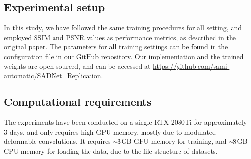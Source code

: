 \subsection{Experimental setup}

In this study, we have followed the same training procedures for all setting, and employed SSIM and PSNR values as performance metrics, as described in the original paper. The parameters for all training settings can be found in the configuration file in our GitHub repository. Our implementation and the trained weights are open-sourced, and can be accessed at \url{https://github.com/sami-automatic/SADNet_Replication}.


\subsection{Computational requirements}
The experiments have been conducted on a single RTX 2080Ti for approximately 3 days, and only requires high GPU memory, mostly due to modulated deformable convolutions. It requires ${\raise.17ex\hbox{$\scriptstyle\mathtt{\sim}$}}3$GB GPU memory for training, and ${\raise.17ex\hbox{$\scriptstyle\mathtt{\sim}$}}8$GB CPU memory for loading the data, due to the file structure of datasets. 



